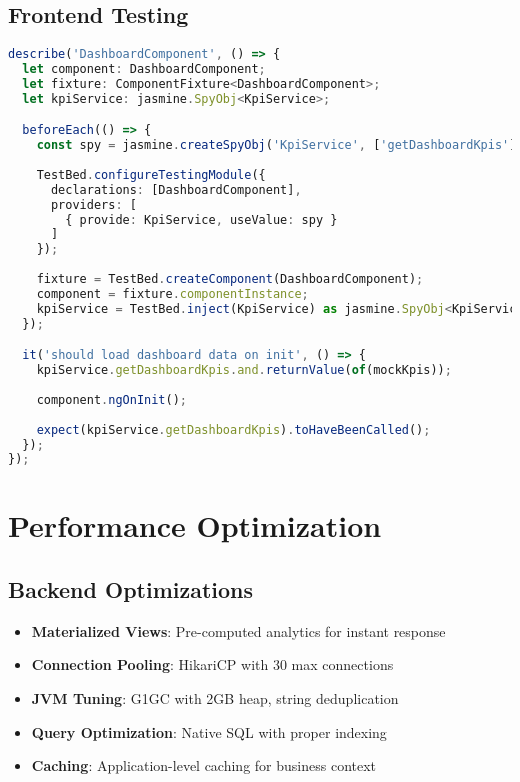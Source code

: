 \documentclass[11pt,a4paper]{article}
\begin{document}
\subsection{Frontend Testing}

\begin{lstlisting}[language=typescript, caption=Component Test]
describe('DashboardComponent', () => {
  let component: DashboardComponent;
  let fixture: ComponentFixture<DashboardComponent>;
  let kpiService: jasmine.SpyObj<KpiService>;

  beforeEach(() => {
    const spy = jasmine.createSpyObj('KpiService', ['getDashboardKpis']);
    
    TestBed.configureTestingModule({
      declarations: [DashboardComponent],
      providers: [
        { provide: KpiService, useValue: spy }
      ]
    });
    
    fixture = TestBed.createComponent(DashboardComponent);
    component = fixture.componentInstance;
    kpiService = TestBed.inject(KpiService) as jasmine.SpyObj<KpiService>;
  });

  it('should load dashboard data on init', () => {
    kpiService.getDashboardKpis.and.returnValue(of(mockKpis));
    
    component.ngOnInit();
    
    expect(kpiService.getDashboardKpis).toHaveBeenCalled();
  });
});
\end{lstlisting}

\section{Performance Optimization}

\subsection{Backend Optimizations}

\begin{itemize}[leftmargin=*]
    \item \textbf{Materialized Views}: Pre-computed analytics for instant response
    \item \textbf{Connection Pooling}: HikariCP with 30 max connections
    \item \textbf{JVM Tuning}: G1GC with 2GB heap, string deduplication
    \item \textbf{Query Optimization}: Native SQL with proper indexing
    \item \textbf{Caching}: Application-level caching for business context
\end{itemize}
\end{document}
